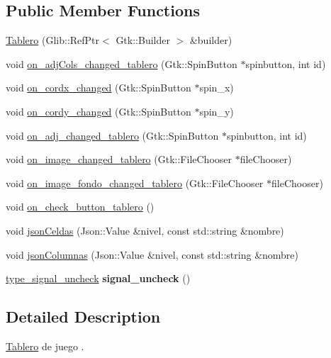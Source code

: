 \subsection*{Public Member Functions}
\begin{DoxyCompactItemize}
\item 
\hyperlink{classTablero_ada8ba5e6781488793f2f78c3799aa4ff}{Tablero} (Glib\-::\-Ref\-Ptr$<$ Gtk\-::\-Builder $>$ \&builder)
\item 
void \hyperlink{classTablero_a58e80bae3f019987b9283723f8a57b84}{on\-\_\-adj\-Cols\-\_\-changed\-\_\-tablero} (Gtk\-::\-Spin\-Button $\ast$spinbutton, int id)
\item 
void \hyperlink{classTablero_afacc7a7dd1f42590e39b87cae48e3275}{on\-\_\-cordx\-\_\-changed} (Gtk\-::\-Spin\-Button $\ast$spin\-\_\-x)
\item 
void \hyperlink{classTablero_a2e94fb8a39b63af67fc1d2d00eb40bb3}{on\-\_\-cordy\-\_\-changed} (Gtk\-::\-Spin\-Button $\ast$spin\-\_\-y)
\item 
void \hyperlink{classTablero_ab7f1519be16814243a5b425600dd59a0}{on\-\_\-adj\-\_\-changed\-\_\-tablero} (Gtk\-::\-Spin\-Button $\ast$spinbutton, int id)
\item 
void \hyperlink{classTablero_acdc841e43131788e8d722f341d2df174}{on\-\_\-image\-\_\-changed\-\_\-tablero} (Gtk\-::\-File\-Chooser $\ast$file\-Chooser)
\item 
void \hyperlink{classTablero_a910b04b2d9807d8618b2e176942da950}{on\-\_\-image\-\_\-fondo\-\_\-changed\-\_\-tablero} (Gtk\-::\-File\-Chooser $\ast$file\-Chooser)
\item 
void \hyperlink{classTablero_a2e329c07dbc1a33793958eb8b192bbc3}{on\-\_\-check\-\_\-button\-\_\-tablero} ()
\item 
void \hyperlink{classTablero_a17f4eadec115ef30e08a45d9b26a6fc4}{json\-Celdas} (Json\-::\-Value \&nivel, const std\-::string \&nombre)
\item 
void \hyperlink{classTablero_a47c278b608b5e1dd22aeafcdba0ea0f2}{json\-Columnas} (Json\-::\-Value \&nivel, const std\-::string \&nombre)
\item 
\hypertarget{classTablero_aefdae69f836627a44aec877940919099}{\hyperlink{classTablero_a1c847f6d745139e22ca87a32f82ded14}{type\-\_\-signal\-\_\-uncheck} {\bfseries signal\-\_\-uncheck} ()}\label{classTablero_aefdae69f836627a44aec877940919099}

\end{DoxyCompactItemize}


\subsection{Detailed Description}
\hyperlink{classTablero}{Tablero} de juego . 

